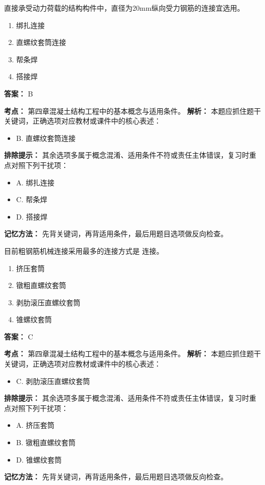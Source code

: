 \documentclass[UTF8,fontset=fandol,11pt]{ctexart}
\begin{document}
\begin{quizbox}[title={第 18 题}]
直接承受动力荷载的结构构件中，直径为20mm纵向受力钢筋的连接宜选用。\\
\begin{enumerate}[label=\Alph*.]
\item 绑扎连接
\item 直螺纹套筒连接
\item 帮条焊
\item 搭接焊
\end{enumerate}
\textbf{答案：} B
\vspace{0.25em}
\begin{answerbox}[title={考点解析}]
\textbf{考点：} 第四章混凝土结构工程中的基本概念与适用条件。
\textbf{解析：} 本题应抓住题干关键词，正确选项对应教材或课件中的核心表述：
\begin{itemize}
\item B. 直螺纹套筒连接
\end{itemize}
\textbf{排除提示：} 其余选项多属于概念混淆、适用条件不符或责任主体错误，复习时重点对照下列干扰项：
\begin{itemize}
\item A. 绑扎连接
\item C. 帮条焊
\item D. 搭接焊
\end{itemize}
\textbf{记忆方法：} 先背关键词，再背适用条件，最后用题目选项做反向检查。
\end{answerbox}
\end{quizbox}

\begin{quizbox}[title={第 19 题}]
目前粗钢筋机械连接采用最多的连接方式是 连接。\\
\begin{enumerate}[label=\Alph*.]
\item 挤压套筒
\item 镦粗直螺纹套筒
\item 剥肋滚压直螺纹套筒
\item 锥螺纹套筒
\end{enumerate}
\textbf{答案：} C
\vspace{0.25em}
\begin{answerbox}[title={考点解析}]
\textbf{考点：} 第四章混凝土结构工程中的基本概念与适用条件。
\textbf{解析：} 本题应抓住题干关键词，正确选项对应教材或课件中的核心表述：
\begin{itemize}
\item C. 剥肋滚压直螺纹套筒
\end{itemize}
\textbf{排除提示：} 其余选项多属于概念混淆、适用条件不符或责任主体错误，复习时重点对照下列干扰项：
\begin{itemize}
\item A. 挤压套筒
\item B. 镦粗直螺纹套筒
\item D. 锥螺纹套筒
\end{itemize}
\textbf{记忆方法：} 先背关键词，再背适用条件，最后用题目选项做反向检查。
\end{answerbox}
\end{quizbox}
\end{document}
